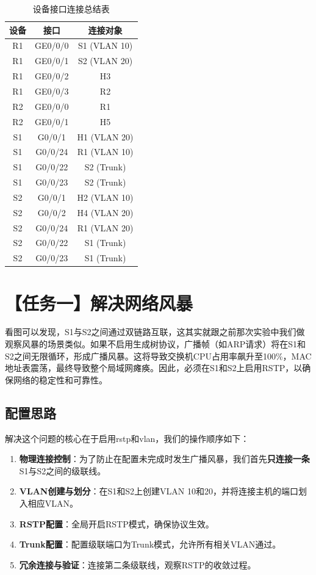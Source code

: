 \documentclass[a4paper]{article}
\begin{document}
\begin{table}[H]
\centering
\caption{设备接口连接总结表} \label{tab:interface_summary}
\begin{tabular}{@{}ccc@{}}
\toprule
\textbf{设备} & \textbf{接口} & \textbf{连接对象} \\
\midrule
R1 & GE0/0/0 & S1 (VLAN 10) \\
R1 & GE0/0/1 & S2 (VLAN 20) \\
R1 & GE0/0/2 & H3 \\
R1 & GE0/0/3 & R2 \\
\midrule
R2 & GE0/0/0 & R1 \\
R2 & GE0/0/1 & H5 \\
\midrule
S1 & G0/0/1 & H1 (VLAN 20) \\
S1 & G0/0/24 & R1 (VLAN 10) \\
S1 & G0/0/22 & S2 (Trunk) \\
S1 & G0/0/23 & S2 (Trunk) \\
\midrule
S2 & G0/0/1 & H2 (VLAN 10) \\
S2 & G0/0/2 & H4 (VLAN 20) \\
S2 & G0/0/24 & R1 (VLAN 20) \\
S2 & G0/0/22 & S1 (Trunk) \\
S2 & G0/0/23 & S1 (Trunk) \\
\bottomrule
\end{tabular}
\end{table}

\newpage

\section{【任务一】解决网络风暴}

看图可以发现，S1与S2之间通过双链路互联，这其实就跟之前那次实验中我们做观察风暴的场景类似。如果不启用生成树协议，广播帧（如ARP请求）将在S1和S2之间无限循环，形成广播风暴。这将导致交换机CPU占用率飙升至100\%，MAC地址表震荡，最终导致整个局域网瘫痪。因此，必须在S1和S2上启用RSTP，以确保网络的稳定性和可靠性。

\subsection{配置思路}

解决这个问题的核心在于启用rstp和vlan，我们的操作顺序如下：

\begin{enumerate}
    \item \textbf{物理连接控制}：为了防止在配置未完成时发生广播风暴，我们首先\textbf{只连接一条}S1与S2之间的级联线。
    \item \textbf{VLAN创建与划分}：在S1和S2上创建VLAN 10和20，并将连接主机的端口划入相应VLAN。
    \item \textbf{RSTP配置}：全局开启RSTP模式，确保协议生效。
    \item \textbf{Trunk配置}：配置级联端口为Trunk模式，允许所有相关VLAN通过。
    \item \textbf{冗余连接与验证}：连接第二条级联线，观察RSTP的收敛过程。
\end{enumerate}
\end{document}
